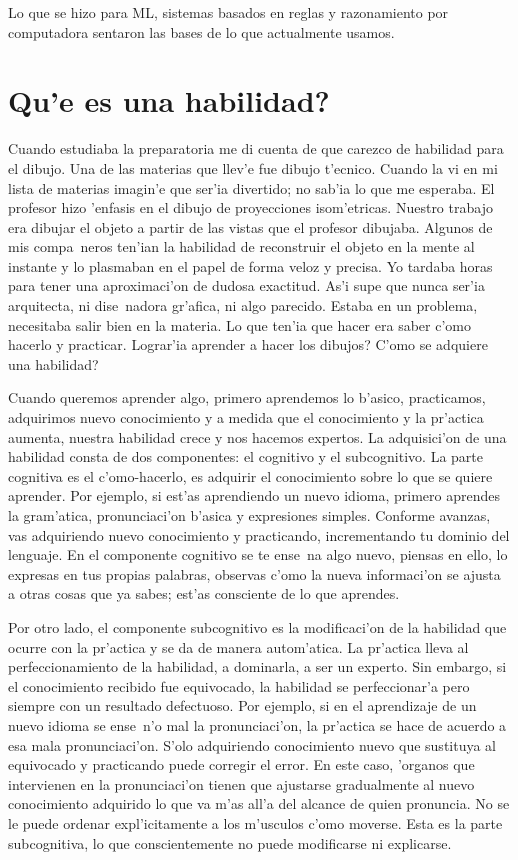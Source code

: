 \documentclass[11pt]{article}
\begin{document}
Lo que se hizo para ML, sistemas basados en reglas y razonamiento por computadora sentaron las bases de lo que actualmente usamos.


\section{\textquestiondown Qu'e es una habilidad?} 

Cuando estudiaba la preparatoria me di cuenta de que carezco de habilidad para el dibujo. Una de las materias que llev'e fue dibujo t'ecnico. Cuando la vi en mi lista de materias imagin'e que ser'ia divertido; no sab'ia lo que me esperaba. El profesor hizo 'enfasis en el dibujo de proyecciones isom'etricas. Nuestro trabajo era dibujar el objeto a partir de las vistas que el profesor dibujaba. Algunos de mis compa~neros ten'ian la habilidad de reconstruir el objeto en la mente al instante y lo plasmaban en el papel de forma veloz y precisa. Yo tardaba horas para tener una aproximaci'on de dudosa exactitud. As'i supe que nunca ser'ia arquitecta, ni dise~nadora gr'afica, ni algo parecido. Estaba en un problema, necesitaba salir bien en la materia. Lo que ten'ia que hacer era saber c'omo hacerlo y practicar. \textquestiondown Lograr'ia aprender a hacer los dibujos? \textquestiondown C'omo se adquiere una habilidad?

\medskip

Cuando queremos aprender algo, primero aprendemos lo b'asico, practicamos, adquirimos nuevo conocimiento y a medida que el conocimiento y la pr'actica aumenta, nuestra habilidad crece y nos hacemos expertos. La adquisici'on de una habilidad consta de dos componentes: el cognitivo y el subcognitivo. La parte cognitiva es el c'omo-hacerlo, es adquirir el conocimiento sobre lo que se quiere aprender. Por ejemplo, si est'as aprendiendo un nuevo idioma, primero aprendes la gram'atica, pronunciaci'on b'asica y expresiones simples. Conforme avanzas, vas adquiriendo nuevo conocimiento y practicando, incrementando tu dominio del lenguaje. En el componente cognitivo se te ense~na algo nuevo, piensas en ello, lo expresas en tus propias palabras, observas c'omo la nueva informaci'on se ajusta a otras cosas que ya sabes; est'as consciente de lo que aprendes.

\medskip
Por otro lado, el componente subcognitivo es la modificaci'on de la habilidad que ocurre con la pr'actica y se da de manera autom'atica. La pr'actica lleva al perfeccionamiento de la habilidad, a dominarla, a ser un experto. Sin embargo, si el conocimiento recibido fue equivocado, la habilidad se perfeccionar'a pero siempre con un resultado defectuoso. Por ejemplo, si en el aprendizaje de un nuevo idioma se ense~n'o mal la pronunciaci'on, la pr'actica se hace de acuerdo a esa mala pronunciaci'on. S'olo adquiriendo conocimiento nuevo que sustituya al equivocado y practicando puede corregir el error. En este caso, 'organos que intervienen en la pronunciaci'on tienen que ajustarse gradualmente al nuevo conocimiento adquirido lo que va m'as all'a del alcance de quien pronuncia. No se le puede ordenar expl'icitamente a los m'usculos c'omo moverse. Esta es la parte subcognitiva, lo que conscientemente no puede modificarse ni explicarse.
\end{document}
